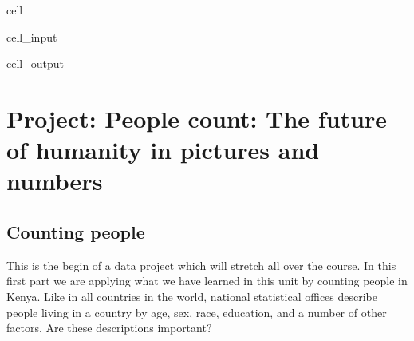 \documentclass[letterpaper,10pt,english]{jupyterBook}
\begin{document}
\begin{sphinxuseclass}{cell}\begin{sphinxVerbatimInput}

\begin{sphinxuseclass}{cell_input}
\begin{sphinxVerbatim}[commandchars=\\\{\}]
\end{sphinxVerbatim}

\end{sphinxuseclass}\end{sphinxVerbatimInput}
\begin{sphinxVerbatimOutput}

\begin{sphinxuseclass}{cell_output}
\noindent{}

\end{sphinxuseclass}\end{sphinxVerbatimOutput}

\end{sphinxuseclass}

\section{Project: People count: The future of humanity in pictures and numbers}
\label{\detokenize{exercises_unit_1:project-people-count-the-future-of-humanity-in-pictures-and-numbers}}

\subsection{Counting people}
\label{\detokenize{exercises_unit_1:counting-people}}
\sphinxAtStartPar
This is the begin of a data project which will stretch all over the course. In this first part we
are applying what we have learned in this unit by counting people in Kenya. Like in all countries
in the world, national statistical offices describe people living in a country
by age, sex, race, education, and a number of other factors. Are these descriptions important?
\end{document}
